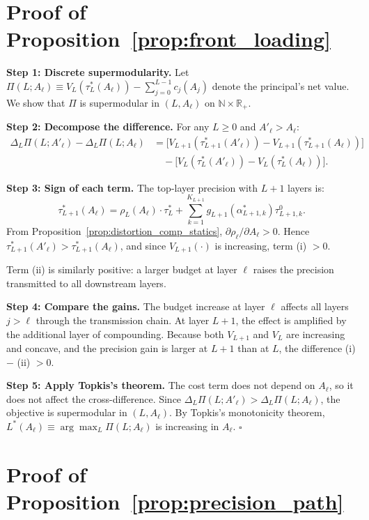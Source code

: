\section{Proof of Proposition~\ref{prop:front_loading}}
\label{app:proof_prop5}

\textbf{Step 1: Discrete supermodularity.} Let $\Pi(L; A_\ell) \equiv V_L(\tau^*_L(A_\ell)) - \sum_{j=0}^{L-1} c_j(A_j)$ denote the principal's net value. We show that $\Pi$ is supermodular in $(L, A_\ell)$ on $\mathbb{N} \times \mathbb{R}_+$.

\textbf{Step 2: Decompose the difference.} For any $L \geq 0$ and $A'_\ell > A_\ell$:
\begin{align*}
\Delta_L \Pi(L; A'_\ell) - \Delta_L \Pi(L; A_\ell) &= \bigl[V_{L+1}(\tau^*_{L+1}(A'_\ell)) - V_{L+1}(\tau^*_{L+1}(A_\ell))\bigr] \\
&\quad - \bigl[V_L(\tau^*_L(A'_\ell)) - V_L(\tau^*_L(A_\ell))\bigr].
\end{align*}

\textbf{Step 3: Sign of each term.} The top-layer precision with $L+1$ layers is:
\begin{equation*}
\tau^*_{L+1}(A_\ell) = \rho_L(A_\ell) \cdot \tau^*_L + \sum_{k=1}^{K_{L+1}} g_{L+1}(\alpha^*_{L+1,k}) \tau^0_{L+1,k}.
\end{equation*}
From Proposition~\ref{prop:distortion_comp_statics}, $\partial \rho_\ell / \partial A_\ell > 0$. Hence $\tau^*_{L+1}(A'_\ell) > \tau^*_{L+1}(A_\ell)$, and since $V_{L+1}(\cdot)$ is increasing, term (i) $> 0$.

Term (ii) is similarly positive: a larger budget at layer $\ell$ raises the precision transmitted to all downstream layers.

\textbf{Step 4: Compare the gains.} The budget increase at layer $\ell$ affects all layers $j > \ell$ through the transmission chain. At layer $L+1$, the effect is amplified by the additional layer of compounding. Because both $V_{L+1}$ and $V_L$ are increasing and concave, and the precision gain is larger at $L+1$ than at $L$, the difference (i) $-$ (ii) $> 0$.

\textbf{Step 5: Apply Topkis's theorem.} The cost term does not depend on $A_\ell$, so it does not affect the cross-difference. Since $\Delta_L \Pi(L; A'_\ell) > \Delta_L \Pi(L; A_\ell)$, the objective is supermodular in $(L, A_\ell)$. By Topkis's monotonicity theorem, $L^*(A_\ell) \equiv \arg\max_L \Pi(L; A_\ell)$ is increasing in $A_\ell$. \hfill $\square$

\section{Proof of Proposition~\ref{prop:precision_path}}
\label{app:proof_precision_path}

